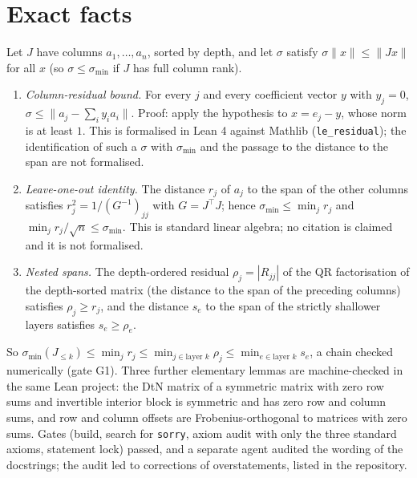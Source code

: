 \documentclass[11pt,a4paper]{article}
\begin{document}
\section{Exact facts}\label{sec:exact}
Let $J$ have columns $a_1,\dots,a_n$, sorted by depth, and let $\sigma$ satisfy $\sigma\|x\|\le\|Jx\|$ for all $x$ (so $\sigma\le\sigma_{\min}$ if $J$ has full column rank).
\begin{enumerate}
\item \emph{Column-residual bound.} For every $j$ and every coefficient vector $y$ with $y_j=0$, $\sigma\le\|a_j-\sum_iy_ia_i\|$. Proof: apply the hypothesis to $x=e_j-y$, whose norm is at least $1$. This is formalised in Lean 4 against Mathlib (\texttt{le\_residual}); the identification of such a $\sigma$ with $\sigma_{\min}$ and the passage to the distance to the span are not formalised.
\item \emph{Leave-one-out identity.} The distance $r_j$ of $a_j$ to the span of the other columns satisfies $r_j^2=1/(G^{-1})_{jj}$ with $G=J^{\top}J$; hence $\sigma_{\min}\le\min_jr_j$ and $\min_jr_j/\sqrt n\le\sigma_{\min}$. This is standard linear algebra; no citation is claimed and it is not formalised.
\item \emph{Nested spans.} The depth-ordered residual $\rho_j=|R_{jj}|$ of the QR factorisation of the depth-sorted matrix (the distance to the span of the preceding columns) satisfies $\rho_j\ge r_j$, and the distance $s_e$ to the span of the strictly shallower layers satisfies $s_e\ge\rho_e$.
\end{enumerate}
So $\sigma_{\min}(J_{\le k})\le\min_jr_j\le\min_{j\in\text{layer }k}\rho_j\le\min_{e\in\text{layer }k}s_e$, a chain checked numerically (gate G1). Three further elementary lemmas are machine-checked in the same Lean project: the DtN matrix of a symmetric matrix with zero row sums and invertible interior block is symmetric and has zero row and column sums,
and row and column offsets are Frobenius-orthogonal to matrices with zero sums. Gates (build, search for \texttt{sorry}, axiom audit with only the three standard axioms, statement lock) passed, and a separate agent audited the wording of the docstrings; the audit led to corrections of overstatements, listed in the repository.
\end{document}
